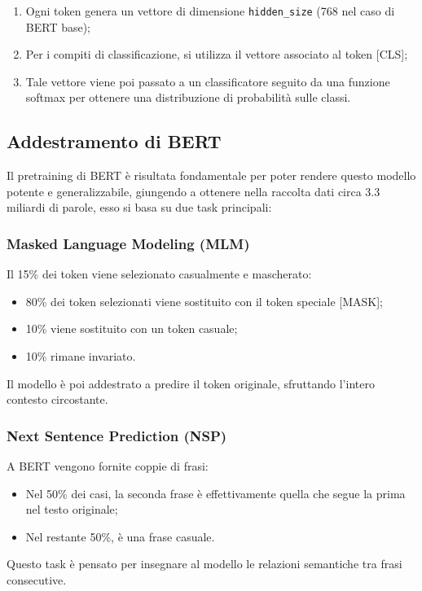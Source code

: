 \begin{enumerate}
    \item Ogni token genera un vettore di dimensione \texttt{hidden\_size} (768 nel caso di BERT base);
    \item Per i compiti di classificazione, si utilizza il vettore associato al token [CLS];
    \item Tale vettore viene poi passato a un classificatore seguito da una funzione softmax per ottenere una distribuzione di probabilità sulle classi.
\end{enumerate}

\subsection{Addestramento di BERT}

Il pretraining di BERT è risultata fondamentale per poter rendere questo modello potente e generalizzabile, giungendo a ottenere nella raccolta dati circa 3.3 miliardi di parole, esso si basa su due task principali:

\subsubsection{Masked Language Modeling (MLM)}

Il 15\% dei token viene selezionato casualmente e mascherato:
\begin{itemize}
    \item 80\% dei token selezionati viene sostituito con il token speciale [MASK];
    \item 10\% viene sostituito con un token casuale;
    \item 10\% rimane invariato.
\end{itemize}
Il modello è poi addestrato a predire il token originale, sfruttando l'intero contesto circostante.

\subsubsection{Next Sentence Prediction (NSP)}

A BERT vengono fornite coppie di frasi:
\begin{itemize}
    \item Nel 50\% dei casi, la seconda frase è effettivamente quella che segue la prima nel testo originale;
    \item Nel restante 50\%, è una frase casuale.
\end{itemize}
Questo task è pensato per insegnare al modello le relazioni semantiche tra frasi consecutive.

